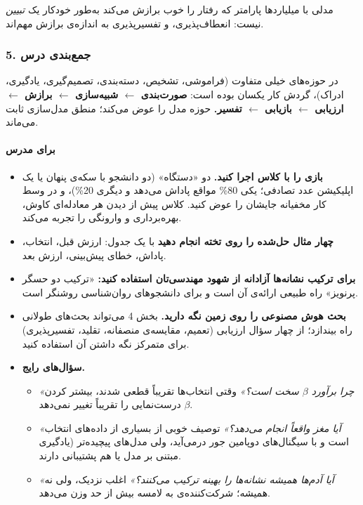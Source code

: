 مدلی با میلیاردها پارامتر که رفتار را خوب برازش می‌کند به‌طور خودکار یک
\emph{تبیین} نیست: انعطاف‌پذیری،  و تفسیرپذیری به
اندازه‌ی برازش مهم‌اند.

\subsubsection{5. جمع‌بندی درس}

در حوزه‌های خیلی متفاوت (فراموشی، تشخیص، دسته‌بندی، تصمیم‌گیری، یادگیری،
ادراک)، گردش کار یکسان بوده است: \textbf{صورت‌بندی \ensuremath{\leftarrow} شبیه‌سازی \ensuremath{\leftarrow} برازش \ensuremath{\leftarrow}
ارزیابی \ensuremath{\leftarrow} بازیابی \ensuremath{\leftarrow} تفسیر.} حوزه مدل را عوض می‌کند؛ منطق مدل‌سازی ثابت
می‌ماند.

\paragraph{برای مدرس}

\begin{itemize}
\tightlist
\item
  \textbf{بازی  را با کلاس اجرا کنید.} دو «دستگاه» (دو دانشجو
  با سکه‌ی پنهان یا یک اپلیکیشن عدد تصادفی؛ یکی 80\% مواقع پاداش می‌دهد و
  دیگری 20\%)، و در وسط کار مخفیانه جایشان را عوض کنید. کلاس پیش از دیدن
  هر معادله‌ای کاوش، بهره‌برداری و وارونگی را تجربه می‌کند.
\item
  \textbf{چهار  مثال حل‌شده را روی تخته انجام دهید}
  با یک جدول: ارزش قبل، انتخاب، پاداش، خطای پیش‌بینی، ارزش بعد.
\item
  \textbf{برای ترکیب نشانه‌ها آزادانه از شهود مهندسی‌تان استفاده کنید:}
  «ترکیب دو حسگر پرنویز» راه طبیعی ارائه‌ی آن است و برای دانشجوهای
  روان‌شناسی روشنگر است.
\item
  \textbf{بحث هوش مصنوعی را روی زمین نگه دارید.} بخش 4 می‌تواند بحث‌های
  طولانی راه بیندازد؛ از چهار سؤال ارزیابی (تعمیم، مقایسه‌ی منصفانه،
  تقلید، تفسیرپذیری) برای متمرکز نگه داشتن آن استفاده کنید.
\item
  \textbf{سؤال‌های رایج.}

  \begin{itemize}
  \tightlist
  \item
    \emph{«چرا برآورد \(\beta\) سخت است؟»} وقتی انتخاب‌ها تقریباً قطعی
    شدند، بیشتر کردن \(\beta\) درست‌نمایی را تقریباً تغییر نمی‌دهد.
  \item
    \emph{«آیا مغز واقعاً  انجام می‌دهد؟»} توصیف خوبی از
    بسیاری از داده‌های انتخاب است و با سیگنال‌های دوپامین جور درمی‌آید، ولی
    مدل‌های پیچیده‌تر (یادگیری مبتنی بر مدل یا  هم
    پشتیبانی دارند.
  \item
    \emph{«آیا آدم‌ها همیشه نشانه‌ها را بهینه ترکیب می‌کنند؟»} اغلب نزدیک،
    ولی نه همیشه؛ شرکت‌کننده‌ی  به لامسه بیش از حد وزن می‌دهد.
  \end{itemize}
\end{itemize}

